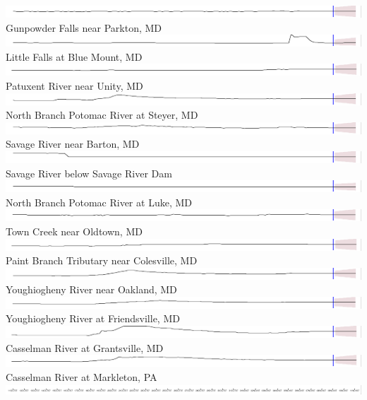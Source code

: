 \documentclass[10pt]{sugconf-ish}
\begin{document}
\includegraphics{fc01581920.pdf}Gunpowder Falls near Parkton, MD\\
\includegraphics{fc01582000.pdf}Little Falls at Blue Mount, MD\\
\includegraphics{fc01591000.pdf}Patuxent River near Unity, MD\\
\includegraphics{fc01595000.pdf}North Branch Potomac River at Steyer, MD\\
\includegraphics{fc01596500.pdf}Savage River near Barton, MD\\
\includegraphics{fc01597500.pdf}Savage River below Savage River Dam \\
\includegraphics{fc01598500.pdf}North Branch Potomac River at Luke, MD\\
\includegraphics{fc01609000.pdf}Town Creek near Oldtown, MD\\
\includegraphics{fc01649150.pdf}Paint Branch Tributary near Colesville, MD\\
\includegraphics{fc03075500.pdf}Youghiogheny River near Oakland, MD\\
\includegraphics{fc03076500.pdf}Youghiogheny River at Friendsville, MD\\
\includegraphics{fc03078000.pdf}Casselman River at Grantsville, MD\\
\includegraphics{fc03079000.pdf}Casselman River at Markleton, PA\\
\includegraphics{spark_axis.pdf}
\end{document}
